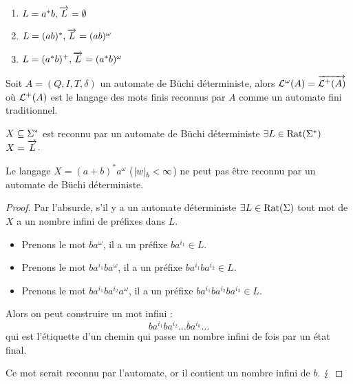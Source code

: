 \begin{exemple}
	\begin{enumerate}
		\item $L = a^*b, \overrightarrow{L} = \emptyset$
		\item $L = (ab)^*, \overrightarrow{L} = (ab)^{\omega}$
		\item $L = (a^*b)^+, \overrightarrow{L} =  (a^*b)^{\omega}$
	\end{enumerate}
\end{exemple}


\begin{prop}[Admis]
	Soit $A = (Q,I,T,\delta)$ un automate de Büchi déterministe, alors $\mathcal{L}^{\omega} (A) = \overrightarrow{\mathcal{L}^+ (A)}$
	où $\mathcal{L}^+ (A)$ est le langage des mots finis reconnus par $A$ comme un automate fini traditionnel.
\end{prop}


\begin{coro}
	$X \subseteq \Sigma^{*}$ est reconnu par un automate de Büchi déterministe \ssi $\exists L \in \text{Rat}(\Sigma^{*})$
	\tq $X = \overrightarrow{L}$.
\end{coro}

\begin{prop}
	Le langage $X = (a+b)^*a^{\omega}$ ($ {\left|w\right|}_b < \infty $) ne peut pas être reconnu par un automate de Büchi déterministe.
\end{prop}

\begin{proof}
	Par l'absurde, s'il y a un automate déterministe $\exists  L \in \text{Rat}(\Sigma)$ \tq tout mot de $X$ a un nombre infini de préfixes dans $L$.

	\begin{itemize}
		\item Prenons le mot $ba^{\omega}$, il a un préfixe $ba^{i_1} \in L$.
		\item Prenons le mot $ba^{i_1}ba^{\omega}$, il a un préfixe $ba^{i_1}ba^{i_2} \in L$.
		\item Prenons le mot $ba^{i_1}ba^{i_2}a^{\omega}$, il a un préfixe $ba^{i_1}ba^{i_2}ba^{i_3} \in L$.
	\end{itemize}

	Alors on peut construire un mot infini :
	$$ ba^{i_1}ba^{i_2}\ldots ba^{i_k}\ldots$$
	qui est l'étiquette d'un chemin qui passe un nombre infini de fois par un état final.
	
	Ce mot serait reconnu par l'automate, or il contient un nombre infini de $b$.  $\lightning$
\end{proof}


